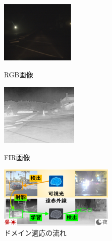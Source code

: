 \documentclass[a4j]{jarticle}
\begin{document}
	\begin{figure}[ht]
		\centering
		\begin{minipage}[b]{0.3\columnwidth}
			\centering
			\includegraphics[height=3cm]{fig/RGB.png}%
			\caption{RGB画像}
		\end{minipage}
		\begin{minipage}[b]{0.3\columnwidth}
			\centering
			\includegraphics[height=3cm]{fig/FIR.png}%
			\caption{FIR画像}
		\end{minipage}
		\begin{minipage}[b]{0.35\columnwidth}
			\centering
			\includegraphics[height=3cm]{fig/domain_adaptation.png}%
			\caption{ドメイン適応の流れ}
		\end{minipage}
	\end{figure}
\end{document}
